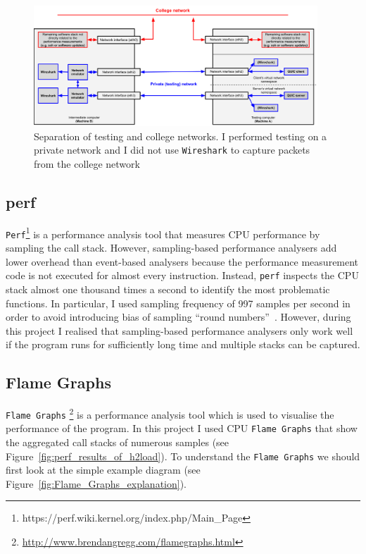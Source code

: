 \documentclass[12pt,a4paper,twoside,openright]{report}
\begin{document}
    \begin{figure}[H]
    \centering
    \includegraphics[width=0.95\textwidth]{figs/Wireshark_separation.png}
    \caption[Separation of testing and college networks]{Separation of testing and college networks. I performed testing on a private network and I did not use \texttt{Wireshark} to capture packets from the college network}
    \label{fig:Wireshark_separation}
    \end{figure}



\subsection{perf}
\texttt{Perf}\footnote{https://perf.wiki.kernel.org/index.php/Main\_Page} is a performance analysis tool that measures CPU performance by sampling the call stack.
However, sampling-based performance analysers add lower overhead than event-based analysers because the performance measurement code is not executed for almost every instruction.
Instead, \texttt{perf} inspects the CPU stack almost one thousand times a second to identify the most problematic functions.
In particular, I used sampling frequency of 997 samples per second in order to avoid introducing bias of sampling \enquote{round numbers}~\cite{perf-cpu-sample}.
However, during this project I realised that sampling-based performance analysers only work well if the program runs for sufficiently long time and multiple stacks can be captured.



\subsection{Flame Graphs}
\texttt{Flame Graphs} \footnote{\url{http://www.brendangregg.com/flamegraphs.html}} is a performance analysis tool which is used to visualise the performance of the program.
In this project I used CPU \texttt{Flame Graphs} that show the aggregated call stacks of numerous samples (see Figure~\ref{fig:perf_results_of_h2load}).
To understand the \texttt{Flame Graphs} we should first look at the simple example diagram (see Figure~\ref{fig:Flame_Graphs_explanation}).
\end{document}
